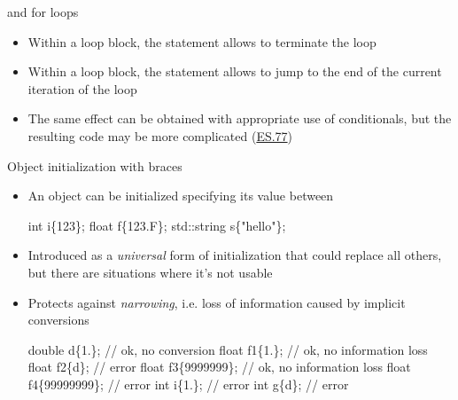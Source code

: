 \begin{frame}[fragile]{ and  for loops}

  \begin{itemize}
  \item<1-> Within a loop block, the  statement allows to terminate
    the loop
  \item<2-> Within a loop block, the  statement allows to jump to
    the end of the current iteration of the loop
  \item<3> The same effect can be obtained with appropriate use of conditionals,
    but the resulting code may be more complicated (\href{https://isocpp.github.io/CppCoreGuidelines/CppCoreGuidelines#es77-minimize-the-use-of-break-and-continue-in-loops}{ES.77})
  \end{itemize}
\end{frame}

\begin{frame}[fragile]{Object initialization with braces}

  \begin{itemize}
  \item An object can be initialized specifying its value between \code{\{\}}

    \begin{codeblock}
int i\{123\};
float f\{123.F\};
std::string s\{"hello"\};\end{codeblock}

  \item Introduced as a \textit{universal} form of initialization that could
    replace all others, but there are situations where it's not usable

  \item Protects against \textit{narrowing}, i.e. loss of information caused by
    implicit conversions

    \begin{codeblock}
double d\{1.\};         // ok, no conversion
float f1\{1.\};         // ok, no information loss
float f2\{d\};          // error
float f3\{9\textquotesingle{}999\textquotesingle{}999\};  // ok, no information loss
float f4\{99\textquotesingle{}999\textquotesingle{}999\}; // error
int i\{1.\};            // error
int g\{d\};             // error\end{codeblock}
  \end{itemize}
\end{frame}

